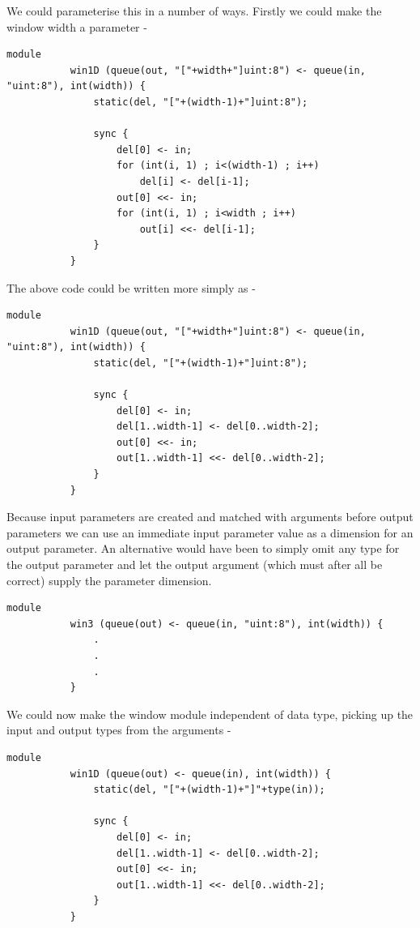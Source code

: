         We could parameterise this in a number of ways. Firstly we could make
        the window width a parameter -
        \begin{lstlisting}[gobble=8, language=threepl]
           module
           win1D (queue(out, "["+width+"]uint:8") <- queue(in, "uint:8"), int(width)) {
               static(del, "["+(width-1)+"]uint:8");
               
               sync {
                   del[0] <- in;
                   for (int(i, 1) ; i<(width-1) ; i++)
                       del[i] <- del[i-1];
                   out[0] <<- in;
                   for (int(i, 1) ; i<width ; i++)
                       out[i] <<- del[i-1];
               }
           }        
        \end{lstlisting}
        The above code could be written more simply as -
        \begin{lstlisting}[gobble=8, language=threepl]
           module
           win1D (queue(out, "["+width+"]uint:8") <- queue(in, "uint:8"), int(width)) {
               static(del, "["+(width-1)+"]uint:8");
               
               sync {
                   del[0] <- in;
                   del[1..width-1] <- del[0..width-2];
                   out[0] <<- in;
                   out[1..width-1] <<- del[0..width-2];
               }
           }        
        \end{lstlisting}
        Because input parameters are created and matched with arguments before
        output parameters we can use an immediate input parameter value as a
        dimension for an output parameter. An alternative would have been to
        simply omit any type for the output parameter and let the output
        argument (which must after all be correct) supply the parameter
        dimension.
        \begin{lstlisting}[gobble=8, language=threepl]
           module
           win3 (queue(out) <- queue(in, "uint:8"), int(width)) {
               .
               .
               .
           }        
        \end{lstlisting}
        
        
        We could now make the window module independent of data type, picking
        up the input and output types from the arguments -
        \begin{lstlisting}[gobble=8, language=threepl]
           module
           win1D (queue(out) <- queue(in), int(width)) {
               static(del, "["+(width-1)+"]"+type(in));
               
               sync {
                   del[0] <- in;
                   del[1..width-1] <- del[0..width-2];
                   out[0] <<- in;
                   out[1..width-1] <<- del[0..width-2];
               }
           }        
        \end{lstlisting}
        
